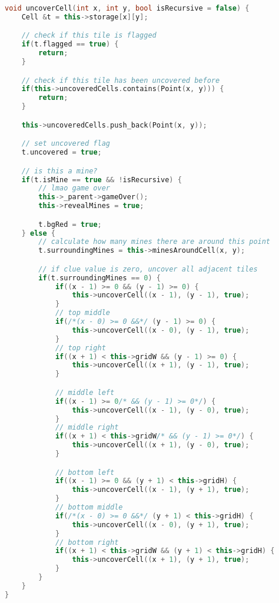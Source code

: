 \documentclass[11pt]{article}
\begin{document}
\begin{lstlisting}[frame=single,language=C++]
void uncoverCell(int x, int y, bool isRecursive = false) {
	Cell &t = this->storage[x][y];

	// check if this tile is flagged
	if(t.flagged == true) {
		return;
	}

	// check if this tile has been uncovered before
	if(this->uncoveredCells.contains(Point(x, y))) {
		return;
	}

	this->uncoveredCells.push_back(Point(x, y));

	// set uncovered flag
	t.uncovered = true;

	// is this a mine?
	if(t.isMine == true && !isRecursive) {
		// lmao game over
		this->_parent->gameOver();
		this->revealMines = true;

		t.bgRed = true;
	} else {
		// calculate how many mines there are around this point
		t.surroundingMines = this->minesAroundCell(x, y);

		// if clue value is zero, uncover all adjacent tiles
		if(t.surroundingMines == 0) {
			if((x - 1) >= 0 && (y - 1) >= 0) {
				this->uncoverCell((x - 1), (y - 1), true);
			}
			// top middle
			if(/*(x - 0) >= 0 &&*/ (y - 1) >= 0) {
				this->uncoverCell((x - 0), (y - 1), true);
			}
			// top right
			if((x + 1) < this->gridW && (y - 1) >= 0) {
				this->uncoverCell((x + 1), (y - 1), true);
			}

			// middle left
			if((x - 1) >= 0/* && (y - 1) >= 0*/) {
				this->uncoverCell((x - 1), (y - 0), true);
			}
			// middle right
			if((x + 1) < this->gridW/* && (y - 1) >= 0*/) {
				this->uncoverCell((x + 1), (y - 0), true);
			}

			// bottom left
			if((x - 1) >= 0 && (y + 1) < this->gridH) {
				this->uncoverCell((x - 1), (y + 1), true);
			}
			// bottom middle
			if(/*(x - 0) >= 0 &&*/ (y + 1) < this->gridH) {
				this->uncoverCell((x - 0), (y + 1), true);
			}
			// bottom right
			if((x + 1) < this->gridW && (y + 1) < this->gridH) {
				this->uncoverCell((x + 1), (y + 1), true);
			}
		}
	}
}
\end{lstlisting}
\end{document}
